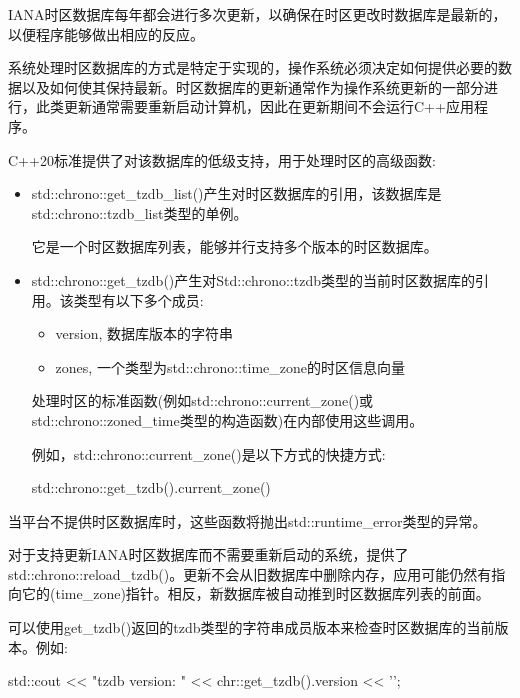 
IANA时区数据库每年都会进行多次更新，以确保在时区更改时数据库是最新的，以便程序能够做出相应的反应。

系统处理时区数据库的方式是特定于实现的，操作系统必须决定如何提供必要的数据以及如何使其保持最新。时区数据库的更新通常作为操作系统更新的一部分进行，此类更新通常需要重新启动计算机，因此在更新期间不会运行C++应用程序。

C++20标准提供了对该数据库的低级支持，用于处理时区的高级函数:

\begin{itemize}
\item 
std::chrono::get\_tzdb\_list()产生对时区数据库的引用，该数据库是std::chrono::tzdb\_list类型的单例。

它是一个时区数据库列表，能够并行支持多个版本的时区数据库。

\item 
std::chrono::get\_tzdb()产生对Std::chrono::tzdb类型的当前时区数据库的引用。该类型有以下多个成员:

\begin{itemize}
\item 
version, 数据库版本的字符串

\item 
zones, 一个类型为std::chrono::time\_zone的时区信息向量
\end{itemize}

处理时区的标准函数(例如std::chrono::current\_zone()或std::chrono::zoned\_time类型的构造函数)在内部使用这些调用。

例如，std::chrono::current\_zone()是以下方式的快捷方式:

\begin{cpp}
std::chrono::get_tzdb().current_zone()
\end{cpp}
\end{itemize}

当平台不提供时区数据库时，这些函数将抛出std::runtime\_error类型的异常。

对于支持更新IANA时区数据库而不需要重新启动的系统，提供了std::chrono::reload\_tzdb()。更新不会从旧数据库中删除内存，应用可能仍然有指向它的(time\_zone)指针。相反，新数据库被自动推到时区数据库列表的前面。

可以使用get\_tzdb()返回的tzdb类型的字符串成员版本来检查时区数据库的当前版本。例如:

\begin{cpp}
std::cout << "tzdb version: " << chr::get_tzdb().version << '\n';
\end{cpp}

